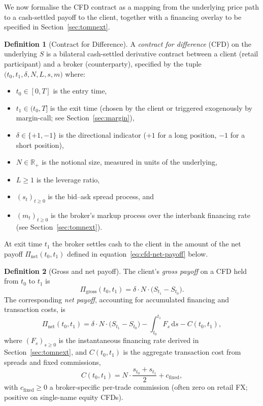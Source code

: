 \documentclass[preprint,12pt,authoryear]{elsarticle}
\newcommand{\RR}{\mathbb{R}}
\newcommand{\dd}{\mathrm{d}}
\theoremstyle{definition}
\newtheorem{definition}{Definition}[section]
\begin{document}
We now formalise the CFD contract as a mapping from the underlying
price path to a cash-settled payoff to the client, together with a
financing overlay to be specified in Section~\ref{sec:tomnext}.

\begin{definition}[Contract for Difference]
\label{def:cfd}
A \emph{contract for difference} (CFD) on the underlying $S$ is a
bilateral cash-settled derivative contract between a client (retail
participant) and a broker (counterparty), specified by the tuple
$\bigl( t_0, t_1, \delta, N, L, s, m \bigr)$ where:
\begin{itemize}
    \item $t_0 \in [0, T]$ is the entry time,
    \item $t_1 \in (t_0, T]$ is the exit time (chosen by the client
    or triggered exogenously by margin-call; see
    Section~\ref{sec:margin}),
    \item $\delta \in \{+1, -1\}$ is the directional indicator ($+1$
    for a long position, $-1$ for a short position),
    \item $N \in \RR_{+}$ is the notional size, measured in units of
    the underlying,
    \item $L \geq 1$ is the leverage ratio,
    \item $(s_t)_{t \geq 0}$ is the bid--ask spread process, and
    \item $(m_t)_{t \geq 0}$ is the broker's markup process over the
    interbank financing rate (see Section~\ref{sec:tomnext}).
\end{itemize}
At exit time $t_1$ the broker settles cash to the client in the
amount of the net payoff $\Pi_{\text{net}}(t_0, t_1)$ defined in
equation~\eqref{eq:cfd-net-payoff} below.
\end{definition}

\begin{definition}[Gross and net payoff]
\label{def:payoff}
The client's \emph{gross payoff} on a CFD held from $t_0$ to $t_1$ is
\begin{equation}
    \Pi_{\text{gross}}(t_0, t_1)
    = \delta \cdot N \cdot \bigl( S_{t_1} - S_{t_0} \bigr).
    \label{eq:cfd-gross-payoff}
\end{equation}
The corresponding \emph{net payoff}, accounting for accumulated
financing and transaction costs, is
\begin{equation}
    \Pi_{\text{net}}(t_0, t_1)
    = \delta \cdot N \cdot \bigl( S_{t_1} - S_{t_0} \bigr)
      - \int_{t_0}^{t_1} F_s \, \dd s
      - C(t_0, t_1),
    \label{eq:cfd-net-payoff}
\end{equation}
where $(F_s)_{s \geq 0}$ is the instantaneous financing rate derived in
Section~\ref{sec:tomnext}, and $C(t_0, t_1)$ is the aggregate
transaction cost from spreads and fixed commissions,
\begin{equation}
    C(t_0, t_1)
    = N \cdot \frac{s_{t_0} + s_{t_1}}{2}
      + c_{\text{fixed}},
    \label{eq:cfd-transaction-cost}
\end{equation}
with $c_{\text{fixed}} \geq 0$ a broker-specific per-trade commission
(often zero on retail FX; positive on single-name equity CFDs).
\end{definition}
\end{document}
